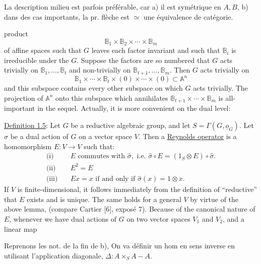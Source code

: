 La description   milieu est parfois préférable, car a) il est  symétrique en $A,B$, b) dans des cas importants, la pr. flèche est $\simeq$ une équivalence de catégorie.



product
\[
\mathbb B_1\times\mathbb B_2\times\cdots\times\mathbb B_m
\]
of affine spaces such that $G$ leaves each factor invariant and such that $\mathbb B_i$ is irreducible under the  $G$. Suppose the factors are so numbered that $G$ acts trivially on $\mathbb B_1,\ldots,\mathbb B_t$ and non-trivially on $\mathbb B_{t+1},\ldots,\mathbb B_m$. Then $G$ acts trivially on
\[
\mathbb B_1\times\cdots\times\mathbb B_t\times(0)\times\cdots\times(0)\subset\mathbb A^n
\]
and this subspace contains every other subspace on which $G$ acts trivially. The projection of $\mathbb A^n$ onto this subspace which annihilates $\mathbb B_{t+1}\times\cdots\times\mathbb B_m$ is all-important in the sequel. Actually, it is more convenient on the dual level:

\uline{Definition 1.5}: Let $G$ be a reductive algebraic group, and let $S=\Gamma(G,\underline{o}_G)$. Let $\hat\sigma$ be a dual action of $G$ on a vector space $V$. Then a \uline{Reynolds operator} is a homomorphism $E:V\longrightarrow V$ such that:
\[
\begin{aligned}
\text{(i)}\quad &E\text{ commutes with }\hat\sigma,\text{ i.e. }\hat\sigma\circ E=(1_S\otimes E)\circ\hat\sigma.\\
\text{(ii)}\quad &E^2=E\\
\text{(iii)}\quad &Ex=x\text{ if and only if }\hat\sigma(x)=1\otimes x.
\end{aligned}
\]
If $V$ is finite-dimensional, it follows immediately from the definition of ``reductive'' that $E$ exists and is unique. The same holds for a general $V$ by virtue of the above lemma, (compare Cartier [6], exposé 7). Because of the canonical nature of $E$, whenever we have dual actions of $G$ on two vector spaces $V_1$ and $V_2$, and a linear map



Reprenons les not.  de la fin de b), On va définir un hom en sens inverse
en utilisant l'application diagonale, $\Delta:A\times_S A\mathbin{-}A$.

